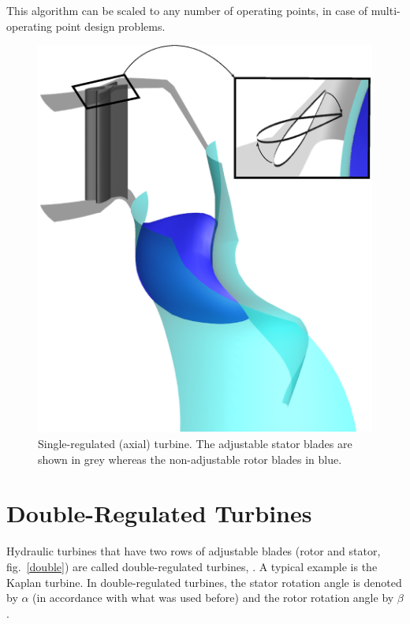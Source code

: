 This algorithm can be scaled to any number of operating points, in case of multi-operating point design problems.     


\begin{figure}[h!]
\centering
\includegraphics[width=.8\textwidth]{SINGLE.eps}
\caption{Single-regulated (axial) turbine.  The adjustable stator blades are shown in grey whereas the non-adjustable rotor blades in blue.}
\label{signle}
\end{figure}



\FloatBarrier  
\section{Double-Regulated Turbines}

Hydraulic turbines that have two rows of adjustable blades (rotor and stator, fig.\ \ref{double}) are called double-regulated turbines,  \cite{papanto,drtina1999hydraulic}. A typical example is the Kaplan turbine.  
In double-regulated turbines, the stator rotation angle is denoted by $\alpha$ (in accordance with what was used before) and  the rotor rotation angle by $\beta$. 

